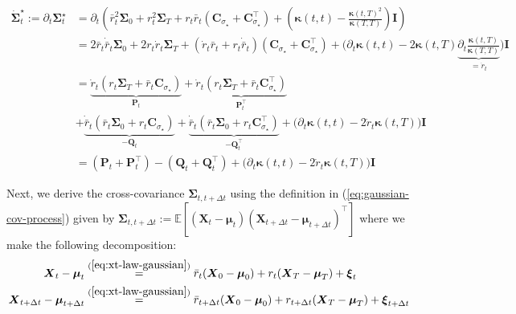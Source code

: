 \documentclass{article}
\begin{document}
\begin{small}
\begin{align}
    \dot{\boldsymbol{\Sigma}}^\star_t:=\partial_t\boldsymbol{\Sigma}^\star_t&=\partial_t\left(\bar{r}_t^2\boldsymbol{\Sigma}_0+r_t^2\boldsymbol{\Sigma}_T+r_t\bar{r}_t(\boldsymbol{C}_{\sigma_\star}+\boldsymbol{C}_{\sigma_\star}^\top)+\left(\boldsymbol{\kappa}(t,t)-\frac{\boldsymbol{\kappa}(t,T)^2}{\boldsymbol{\kappa}(T,T)}\right)\boldsymbol{I}\right)\nonumber\\
    &=2\bar{r}_t\dot{\bar{r}}_t\boldsymbol{\Sigma}_0+2r_t\dot{r}_t\boldsymbol{\Sigma}_T+(\dot{r}_t\bar{r}_t+r_t\dot{\bar{r}}_t)(\boldsymbol{C}_{\sigma_\star}+\boldsymbol{C}_{\sigma_\star}^\top)+\bigg(\partial_t\boldsymbol{\kappa}(t,t)-2\boldsymbol{\kappa}(t,T)\underbrace{\partial_t\frac{\boldsymbol{\kappa}(t,T)}{\boldsymbol{\kappa}(T,T)}}_{=\dot{r}_t}\bigg)\boldsymbol{I}\nonumber\\
    &=\underbrace{\dot{r}_t\left(r_t\boldsymbol{\Sigma}_T+\bar{r}_t\boldsymbol{C}_{\sigma_\star}\right)}_{\boldsymbol{P}_t}+\underbrace{\dot{r}_t\left(r_t\boldsymbol{\Sigma}_T+\bar{r}_t\boldsymbol{C}_{\sigma_\star}^\top\right)}_{\boldsymbol{P}_t^\top}\nonumber\\
    &+\underbrace{\dot{\bar{r}}_t\left(\bar{r}_t\boldsymbol{\Sigma}_0+r_t\boldsymbol{C}_{\sigma_\star}\right)}_{-\boldsymbol{Q}_t}+\underbrace{\dot{\bar{r}}_t\left(\bar{r}_t\boldsymbol{\Sigma}_0+r_t\boldsymbol{C}_{\sigma_\star}^\top\right)}_{-\boldsymbol{Q}_t^\top}+\bigg(\partial_t\boldsymbol{\kappa}(t,t)-2\dot{r}_t\boldsymbol{\kappa}(t,T)\bigg)\boldsymbol{I}\nonumber\\
    &=\left(\boldsymbol{P}_t+\boldsymbol{P}^\top_t\right)-\left(\boldsymbol{Q}_t+\boldsymbol{Q}^\top_t\right)+\bigg(\partial_t\boldsymbol{\kappa}(t,t)-2\dot{r}_t\boldsymbol{\kappa}(t,T)\bigg)\boldsymbol{I}\label{eq:gaus-dot-cov-def}
\end{align}
\end{small}
Next, we derive the cross-covariance $\boldsymbol{\Sigma}_{t, t+\Delta t}$ using the definition in (\ref{eq:gaussian-cov-process}) given by $\boldsymbol{\Sigma}_{t, t+\Delta t}:=\mathbb{E}\left[(\boldsymbol{X}_t-\boldsymbol{\mu}_t)(\boldsymbol{X}_{t+\Delta t}-\boldsymbol{\mu}_{t+\Delta t})^\top\right]$ where we make the following decomposition:
\begin{align}
    \boldsymbol{X}_t-\boldsymbol{\mu}_t&\overset{(\ref{eq:xt-law-gaussian})}{=}\bar{r}_t(\boldsymbol{X}_0-\boldsymbol{\mu}_0)+r_t(\boldsymbol{X}_T-\boldsymbol{\mu}_T)+\boldsymbol{\xi}_t\\
    \boldsymbol{X}_{t+\Delta t}-\boldsymbol{\mu}_{t+\Delta t}&\overset{(\ref{eq:xt-law-gaussian})}{=}\bar{r}_{t+\Delta t}(\boldsymbol{X}_0-\boldsymbol{\mu}_0)+r_{t+\Delta t}(\boldsymbol{X}_T-\boldsymbol{\mu}_T)+\boldsymbol{\xi}_{t+\Delta t}
\end{align}
\end{document}
